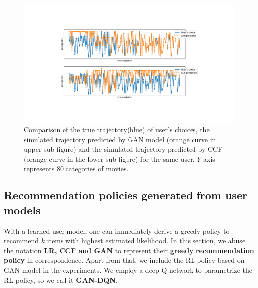\documentclass{article} %
\begin{document}
\begin{figure}[htbp]
\vspace{-3mm}
  \begin{minipage}[c]{0.6\textwidth}
    \centering
    \includegraphics[width=\textwidth]{user10_new}
  \end{minipage}\hfill
  \begin{minipage}[c]{0.4\textwidth}
    \centering
    \caption{\small Comparison of the true trajectory(blue) of user's choices, the simulated trajectory predicted by GAN model (orange curve in upper sub-figure) and the simulated trajectory predicted by CCF (orange curve in the lower sub-figure) for the same user. $Y$-axis represents 80 categories of movies.
    } \label{fg:traj}
  \end{minipage}
  \vspace{-3mm}
\end{figure}

\vspace{-3mm}
\subsection{Recommendation policies generated from user models}\label{sec:experiment2}
\vspace{-3mm}

With a learned user model, one can immediately derive a greedy policy to recommend $k$ items with highest estimated likelihood. In this section, we abuse the notation {\bf LR, CCF and GAN} to represent their {\bf greedy recommendation policy} in correspondence. Apart from that, we include the RL policy based on GAN model in the experiments. We employ a deep Q network to parametrize the RL policy, so we call it {\bf GAN-DQN}.
\end{document}
